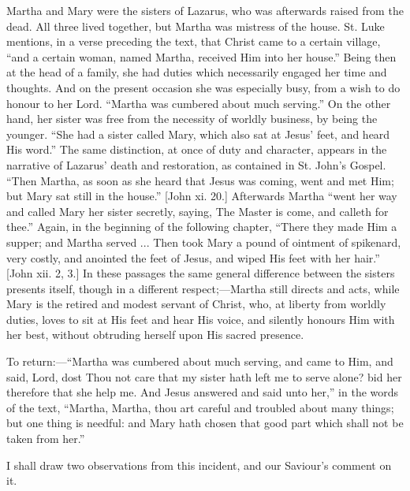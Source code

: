 Martha and Mary were the sisters of Lazarus, who was afterwards
raised from the dead. All three lived together, but Martha was
mistress of the house. St. Luke mentions, in a verse preceding the
text, that Christ came to a certain village, ``and a certain
woman, named Martha, received Him into her house.'' Being then at
the head of a family, she had duties which necessarily engaged her
time and thoughts. And on the present occasion she was especially
busy, from a wish to do honour to her Lord. ``Martha was cumbered
about much serving.'' On the other hand, her sister was free from
the necessity of worldly business, by being the younger. ``She had
a sister called Mary, which also sat at Jesus' feet, and heard His
word.'' The same distinction, at once of duty and character,
appears in the narrative of Lazarus' death and restoration, as
contained in St. John's Gospel. ``Then Martha, as soon as she
heard that Jesus was coming, went and met Him; but Mary sat still in
the house.'' [John xi. 20.] Afterwards Martha ``went her way
and called Mary her sister secretly, saying, The Master is come, and
calleth for thee.'' Again, in the beginning of the following
chapter, ``There they made Him a supper; and Martha served ...
Then took Mary a pound of ointment of spikenard, very costly, and
anointed the feet of Jesus, and wiped His feet with her hair.''
[John xii. 2, 3.] In these passages the same general difference
between the sisters presents itself, though in a different respect;—Martha
still directs and acts, while Mary is the retired and modest servant
of Christ, who, at liberty from worldly duties, loves to sit at His
feet and hear His voice, and silently honours Him with her best,
without obtruding herself upon His sacred presence.

To return:—``Martha was cumbered about much serving, and came
to Him, and said, Lord, dost Thou not care that my sister hath left me
to serve alone? bid her therefore that she help me. And Jesus
answered and said unto her,'' in the words of the text,
``Martha, Martha, thou art careful and troubled about many things;
but one thing is needful: and Mary hath chosen that good part which
shall not be taken from her.''

I shall draw two observations from this incident, and our Saviour's
comment on it.

